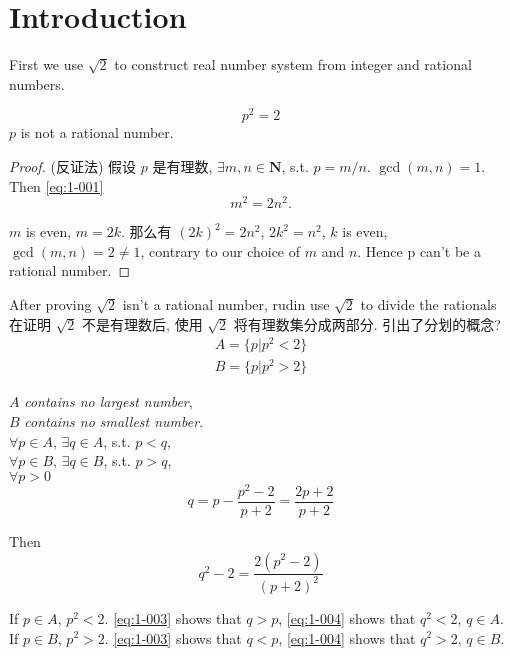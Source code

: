 
\section{Introduction}
First we use $\sqrt{2}$ to construct real number system from integer and rational numbers.

\begin{myExample}\label{Example:1.1}
\begin{equation}\label{eq:1-001}
    p^2=2
\end{equation}
$p$ is not a rational number.
\end{myExample}

\begin{proof}
(反证法) 假设 $p$ 是有理数,  $\exists m,n \in \mathbf{N}$, s.t. $p=m/n$. $\gcd (m,n) = 1$.
Then \ref{eq:1-001}
\begin{equation}\label{eq:1-002}
    m^2 = 2n^2.
\end{equation}

$m$ is even, $m = 2k$.
那么有 $(2k)^2 = 2n^2$, $2k^2 = n^2$, $k$ is even, $\gcd (m,n)=2\neq 1$,
contrary to our choice of $m$ and $n$. Hence p can't be a rational number.
\end{proof}

After proving $\sqrt{2}$ isn't a rational number, rudin use $\sqrt{2}$ to divide the rationals
在证明 $\sqrt{2}$ 不是有理数后, 使用 $\sqrt{2}$ 将有理数集分成两部分.  引出了分划的概念? 
\begin{align*}
    A = \{p|p^2<2\}\\
    B = \{p|p^2>2\}
\end{align*}

$A$ \emph{contains no largest number},\\
$B$ \emph{contains no smallest number}.\\
$\forall p\in A$, $\exists q\in A$, s.t. $p<q$,\\
$\forall p\in B$, $\exists q\in B$, s.t. $p>q$,\\
$\forall p>0$
\begin{equation}\label{eq:1-003}
    q = p-\frac{p^2-2}{p+2} = \frac{2p+2}{p+2}
\end{equation}

Then 
\begin{equation}
    \label{eq:1-004}
    q^2 - 2 = \frac{2(p^2-2)}{(p+2)^2}
\end{equation}

If $p\in A$, $p^2<2$. \ref{eq:1-003} shows that $q>p$, \ref{eq:1-004} shows that $q^2<2$, $q\in A$.
If $p\in B$, $p^2>2$. \ref{eq:1-003} shows that $q<p$, \ref{eq:1-004} shows that $q^2>2$, $q\in B$.


